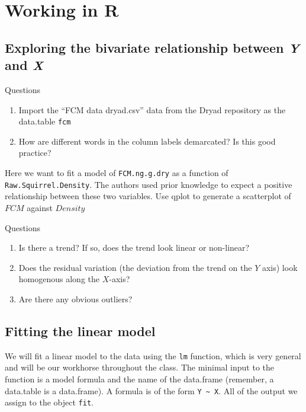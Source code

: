 \documentclass[]{book}
\providecommand{\tightlist}{%
  \setlength{\itemsep}{0pt}\setlength{\parskip}{0pt}}
\theoremstyle{definition}
\theoremstyle{definition}
\theoremstyle{definition}
\theoremstyle{remark}
\begin{document}
\section{Working in R}\label{working-in-r}

\subsection{\texorpdfstring{Exploring the bivariate relationship between
\emph{Y} and
\emph{X}}{Exploring the bivariate relationship between Y and X}}\label{exploring-the-bivariate-relationship-between-y-and-x}

Questions

\begin{enumerate}
\def\labelenumi{\arabic{enumi}.}
\tightlist
\item
  Import the ``FCM data dryad.csv'' data from the Dryad repository as
  the data.table \texttt{fcm}
\item
  How are different words in the column labels demarcated? Is this good
  practice?
\end{enumerate}

Here we want to fit a model of \texttt{FCM.ng.g.dry} as a function of
\texttt{Raw.Squirrel.Density}. The authors used prior knowledge to
expect a positive relationship between these two variables. Use qplot to
generate a scatterplot of \(FCM\) against \(Density\)

Questions

\begin{enumerate}
\def\labelenumi{\arabic{enumi}.}
\setcounter{enumi}{2}
\tightlist
\item
  Is there a trend? If so, does the trend look linear or non-linear?
\item
  Does the residual variation (the deviation from the trend on the \(Y\)
  axis) look homogenous along the \(X\)-axis?
\item
  Are there any obvious outliers?
\end{enumerate}

\subsection{Fitting the linear model}\label{fitting-the-linear-model}

We will fit a linear model to the data using the \texttt{lm} function,
which is very general and will be our workhorse throughout the class.
The minimal input to the function is a model formula and the name of the
data.frame (remember, a data.table is a data.frame). A formula is of the
form \texttt{Y\ \textasciitilde{}\ X}. All of the output we assign to
the object \texttt{fit}.
\end{document}
